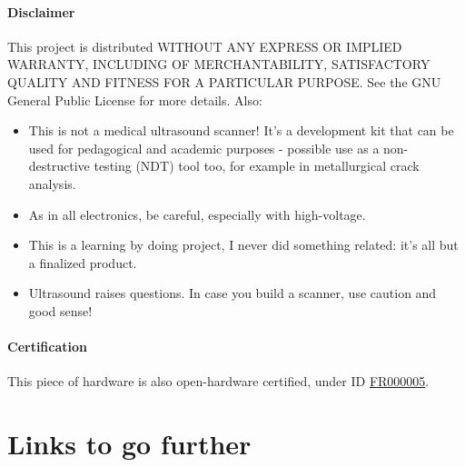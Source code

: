 \documentclass{article}
\begin{document}
\paragraph{Disclaimer}

This project is distributed WITHOUT ANY EXPRESS OR IMPLIED WARRANTY, INCLUDING OF MERCHANTABILITY, SATISFACTORY QUALITY AND FITNESS FOR A PARTICULAR PURPOSE. See the GNU General Public License for more details. Also:

\begin{itemize}
\item This is not a medical ultrasound scanner! It’s a development kit that can be used for pedagogical and academic purposes - possible use as a non-destructive testing (NDT) tool too, for example in metallurgical crack analysis.
\item As in all electronics, be careful, especially with high-voltage.
\item This is a learning by doing project, I never did something related: it’s all but a finalized product.
\item Ultrasound raises questions. In case you build a scanner, use caution and good sense!
\end{itemize}

\paragraph{Certification}

This piece of hardware is also open-hardware certified, under ID \href{https://certification.oshwa.org/fr000005.html}{FR000005}.



\section{Links to go further}
\end{document}
